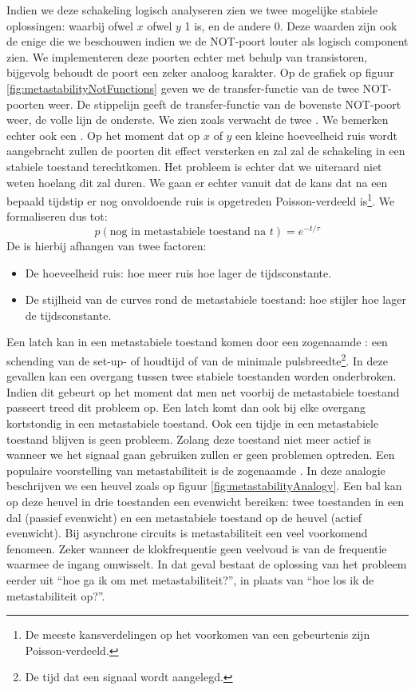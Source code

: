 Indien we deze schakeling logisch analyseren zien we twee mogelijke stabiele oplossingen: waarbij ofwel $x$ ofwel $y$ 1 is, en de andere 0. Deze waarden zijn ook de enige die we beschouwen indien we de NOT-poort louter als logisch component zien. We implementeren deze poorten echter met behulp van transistoren, bijgevolg behoudt de poort een zeker analoog karakter. Op de grafiek op figuur \ref{fig:metastabilityNotFunctions} geven we de transfer-functie van de twee NOT-poorten weer. De stippelijn geeft de transfer-functie van de bovenste NOT-poort weer, de volle lijn de onderste. We zien zoals verwacht de twee . We bemerken echter ook een . Op het moment dat op $x$ of $y$ een kleine hoeveelheid ruis wordt aangebracht zullen de poorten dit effect versterken en zal zal de schakeling in een stabiele toestand terechtkomen. Het probleem is echter dat we uiteraard niet weten hoelang dit zal duren. We gaan er echter vanuit dat de kans dat na een bepaald tijdstip er nog onvoldoende ruis is opgetreden Poisson-verdeeld is\footnote{De meeste kansverdelingen op het voorkomen van een gebeurtenis zijn Poisson-verdeeld.}. We formaliseren dus tot:
\begin{equation}
p\left(\mbox{nog in metastabiele toestand na $t$}\right)=e^{-t/\tau}
\end{equation}
De  is hierbij afhangen van twee factoren:
\begin{itemize}
 \item De hoeveelheid ruis: hoe meer ruis hoe lager de tijdsconstante.
 \item De stijlheid van de curves rond de metastabiele toestand: hoe stijler hoe lager de tijdsconstante.
\end{itemize}
Een latch kan in een metastabiele toestand komen door een zogenaamde : een schending van de set-up- of houdtijd of van de minimale pulsbreedte\footnote{De tijd dat een signaal wordt aangelegd.}. In deze gevallen kan een overgang tussen twee stabiele toestanden worden onderbroken. Indien dit gebeurt op het moment dat men net voorbij de metastabiele toestand passeert treed dit probleem op. Een latch komt dan ook bij elke overgang kortstondig in een metastabiele toestand. Ook een tijdje in een metastabiele toestand blijven is geen probleem. Zolang deze toestand niet meer actief is wanneer we het signaal gaan gebruiken zullen er geen problemen optreden. Een populaire voorstelling van metastabiliteit is de zogenaamde . In deze analogie beschrijven we een heuvel zoals op figuur \ref{fig:metastabilityAnalogy}. Een bal kan op deze heuvel in drie toestanden een evenwicht bereiken: twee toestanden in een dal (passief evenwicht) en een metastabiele toestand op de heuvel (actief evenwicht). Bij asynchrone circuits is metastabiliteit een veel voorkomend fenomeen. Zeker wanneer de klokfrequentie geen veelvoud is van de frequentie waarmee de ingang omwisselt. In dat geval bestaat de oplossing van het probleem eerder uit ``hoe ga ik om met metastabiliteit?'', in plaats van ``hoe los ik de metastabiliteit op?''.
